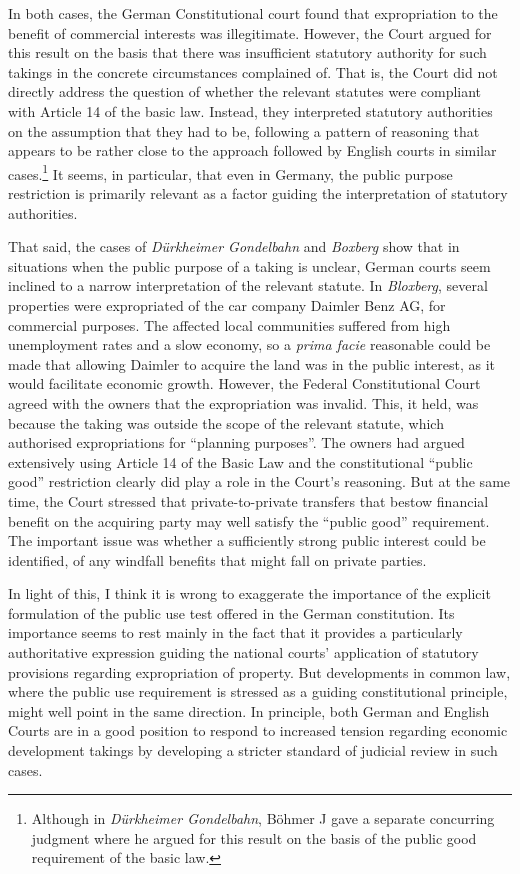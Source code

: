 In both cases, the German Constitutional court found that expropriation to the benefit of commercial interests was illegitimate. However, the Court argued for this result on the basis that there was insufficient statutory authority for such takings in the concrete circumstances complained of. That is, the Court did not directly address the question of whether the relevant statutes were compliant with Article 14 of the basic law. Instead, they interpreted statutory authorities on the assumption that they had to be, following a pattern of reasoning that appears to be rather close to the approach followed by English courts in similar cases.\footnote{Although in {\it Dürkheimer Gondelbahn}, Böhmer J gave a separate concurring judgment where he argued for this result on the basis of the public good requirement of the basic law.} It seems, in particular, that even in Germany, the public purpose restriction is primarily relevant as a factor guiding the interpretation of statutory authorities.

That said, the cases of {\it D{\"u}rkheimer Gondelbahn} and {\it Boxberg} show that in situations when the public purpose of a taking is unclear, German courts seem inclined to  a narrow interpretation of the relevant statute. In {\it Bloxberg}, several properties were expropriated  of the car company Daimler Benz AG, for commercial purposes. The affected local communities suffered from high unemployment rates and a slow economy, so a {\it prima facie} reasonable  could be made that allowing Daimler to acquire the land was in the public interest, as it would facilitate economic growth. However, the Federal Constitutional Court agreed with the owners that the expropriation was invalid. This, it held, was because the taking was outside the scope of the relevant statute, which authorised expropriations for ``planning purposes''. The owners had argued extensively using Article 14 of the Basic Law and the constitutional ``public good'' restriction clearly did play a role in the Court's reasoning. But at the same time, the Court stressed that private-to-private transfers that bestow financial benefit on the acquiring party may well satisfy the ``public good'' requirement. The important issue was whether a sufficiently strong public interest could be identified,  of any windfall benefits that might fall on private parties.

In light of this, I think it is wrong to exaggerate the importance of the explicit formulation of the public use test offered in the German constitution. Its importance seems to rest mainly in the fact that it provides a particularly authoritative expression guiding the national courts' application of statutory provisions regarding expropriation of property. But developments in common law, where the public use requirement is stressed as a guiding constitutional principle, might well point in the same direction. In principle, both German and English Courts are in a good position to respond to increased tension regarding economic development takings by developing a stricter standard of judicial review in such cases.

